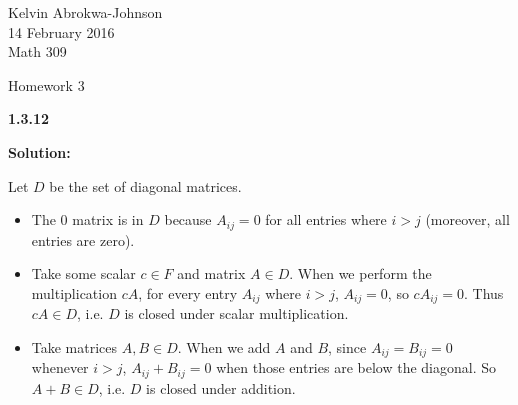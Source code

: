 \documentclass[11pt]{article} %
\begin{document}
 

Kelvin Abrokwa-Johnson \\
14 February 2016 \\
Math 309

\begin{center} Homework 3 \end{center}





{\bf 1.3.12}

\medskip
{\bf Solution:}

Let $D$ be the set of diagonal matrices.

\begin{itemize}

\item The $0$ matrix is in $D$ because $A_{ij} = 0$ for all entries where $i > j$ (moreover, all entries are zero).

\item Take some scalar $c \in F$ and matrix $A \in D$. When we perform the multiplication $cA$, for every entry $A_{ij}$ where $i > j$, $A_{ij} = 0$, so $cA_{ij} = 0$. Thus $cA \in D$, i.e. $D$ is closed under scalar multiplication.

\item Take matrices $A, B \in D$. When we add $A$ and $B$, since $A_{ij} = B_{ij} = 0$ whenever $i > j$, $A_{ij} + B_{ij} = 0$ when those entries are below the diagonal. So $A + B \in D$, i.e. $D$ is closed under addition.
\end{itemize}


\end{document}
